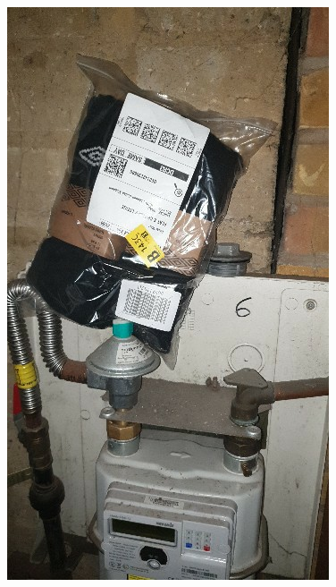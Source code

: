 \documentclass{minimal}
\begin{document}
\pagebreak
\vspace*{\fill}
\centering
\includegraphics[height=0.82\textheight]{imageId-e6c55c8a-14eb-854c-c7a5-27f976c619a3.jpg}
\vspace*{\fill}
\pagebreak
\end{document}
